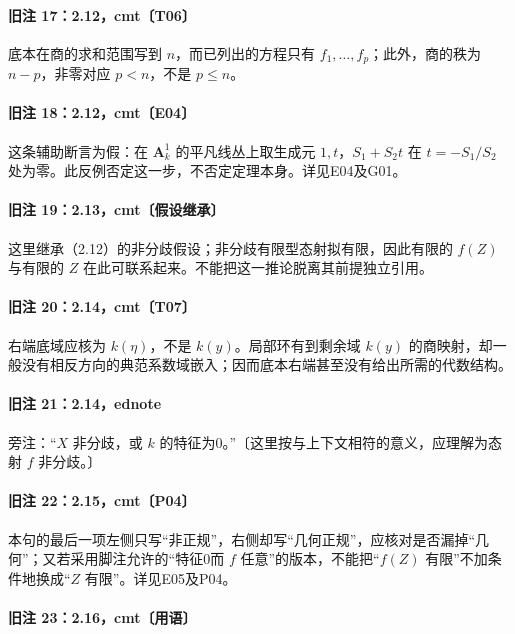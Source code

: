 \documentclass[UTF8,a4paper]{ctexbook}
\begin{document}
\paragraph{旧注 17：2.12，cmt〔T06〕}

底本在商的求和范围写到 $n$，而已列出的方程只有 $f_1,\ldots,f_p$；此外，商的秩为 $n-p$，非零对应 $p<n$，不是 $p\leq n$。

\paragraph{旧注 18：2.12，cmt〔E04〕}

这条辅助断言为假：在 $\mathbf A^1_k$ 的平凡线丛上取生成元 $1,t$，$S_1+S_2t$ 在 $t=-S_1/S_2$ 处为零。此反例否定这一步，不否定定理本身。详见E04及G01。

\paragraph{旧注 19：2.13，cmt〔假设继承〕}

这里继承（2.12）的非分歧假设；非分歧有限型态射拟有限，因此有限的 $f(Z)$ 与有限的 $Z$ 在此可联系起来。不能把这一推论脱离其前提独立引用。

\paragraph{旧注 20：2.14，cmt〔T07〕}

右端底域应核为 $k(\eta)$，不是 $k(y)$。局部环有到剩余域 $k(y)$ 的商映射，却一般没有相反方向的典范系数域嵌入；因而底本右端甚至没有给出所需的代数结构。

\paragraph{旧注 21：2.14，ednote}

旁注：“$X$ 非分歧，或 $k$ 的特征为0。”〔这里按与上下文相符的意义，应理解为态射 $f$ 非分歧。〕

\paragraph{旧注 22：2.15，cmt〔P04〕}

本句的最后一项左侧只写“非正规”，右侧却写“几何正规”，应核对是否漏掉“几何”；又若采用脚注允许的“特征0而 $f$ 任意”的版本，不能把“$f(Z)$ 有限”不加条件地换成“$Z$ 有限”。详见E05及P04。

\paragraph{旧注 23：2.16，cmt〔用语〕}
\end{document}
